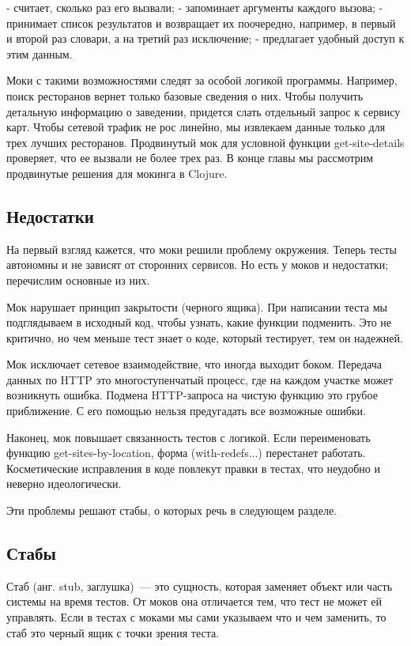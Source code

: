 - считает, сколько раз его вызвали;
- запоминает аргументы каждого вызова;
- принимает список результатов и возвращает их поочередно, например, в первый и
  второй раз словари, а на третий раз исключение;
- предлагает удобный доступ к этим данным.

Моки с такими возможностями следят за особой логикой программы. Например, поиск
ресторанов вернет только базовые сведения о них. Чтобы получить детальную
информацию о заведении, придется слать отдельный запрос к сервису карт. Чтобы
сетевой трафик не рос линейно, мы извлекаем данные только для трех лучших
ресторанов. Продвинутый мок для условной функции get-site-details проверяет, что
ее вызвали не более трех раз. В конце главы мы рассмотрим продвинутые решения
для мокинга в Clojure.

\subsection{Недостатки}

На первый взгляд кажется, что моки решили проблему окружения. Теперь тесты
автономны и не зависят от сторонних сервисов. Но есть у моков и недостатки;
перечислим основные из них.

Мок нарушает принцип закрытости (черного ящика). При написании теста мы
подглядываем в исходный код, чтобы узнать, какие функции подменить. Это не
критично, но чем меньше тест знает о коде, который тестирует, тем он надежней.

Мок исключает сетевое взаимодействие, что иногда выходит боком. Передача данных
по HTTP это многоступенчатый процесс, где на каждом участке может возникнуть
ошибка. Подмена HTTP-запроса на чистую функцию это грубое приближение. С его
помощью нельзя предугадать все возможные ошибки.

Наконец, мок повышает связанность тестов с логикой. Если переименовать функцию
get-sites-by-location, форма (with-redefs...) перестанет работать. Косметические
исправления в коде повлекут правки в тестах, что неудобно и неверно
идеологически.

Эти проблемы решают стабы, о которых речь в следующем разделе.

\subsection{Стабы}

Стаб (анг. stub, заглушка)~--- это сущность, которая заменяет объект или часть
системы на время тестов. От моков она отличается тем, что тест не может ей
управлять. Если в тестах с моками мы сами указываем что и чем заменить, то стаб
это черный ящик с точки зрения теста.

